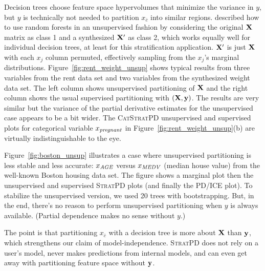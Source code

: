 \documentclass[12pt]{article}
\newcommand{\figref}[1]{Figure~\ref{#1}}
\newcommand{\spd}{\fontfamily{cmr}\textsc{\small StratPD}}
\newcommand{\cspd}{\fontfamily{cmr}\textsc{\small CatStratPD}}
\newcommand{\xnc}{$x_{\overline{c}}$}
\begin{document}
Decision trees choose feature space hypervolumes that minimize the variance in $y$, but $y$ is technically not needed to partition \xnc{} into similar regions. \cite{RFunsup} described how to use random forests in an unsupervised fashion by considering the original $\bf X$ matrix as class 1 and a synthesized $\bf X'$ as class 2, which works equally well for individual decision trees, at least for this stratification application. $\bf X'$ is just $\bf X$ with each $x_j$ column permuted, effectively sampling from the $x_j$'s marginal distributions. \figref{fig:rent_weight_unsup} shows typical results from three variables from the rent data set and two variables from the synthesized weight data set.  The left column shows unsupervised partitioning of $\bf X$ and the right column shows the usual supervised partitioning with $(\bf X, y)$. The results are very similar but the variance of the partial derivative estimates for the unsupervised case appears to be a bit wider. The \cspd{} unsupervised and supervised plots for categorical variable $x_{\it pregnant}$ in \figref{fig:rent_weight_unsup}(b) are virtually indistinguishable to the eye. 

\figref{fig:boston_unsup} illustrates a case where unsupervised partitioning is less stable and less accurate: $x_{\it AGE}$ versus $x_{\it MEDV}$ (median house value) from the well-known Boston housing data set. The figure shows a marginal plot then the unsupervised and supervised \spd{} plots (and finally the PD/ICE plot). To stabilize the unsupervised version, we used 20 trees with bootstrapping. But, in the end, there's no reason to perform unsupervised partitioning when $y$ is always available. (Partial dependence makes no sense without $y$.) 

The point is that partitioning \xnc{}  with a decision tree is more about $\bf X$ than $\bf y$, which strengthens our claim of model-independence. \spd{} does not rely on a user's model, never makes predictions from internal models, and can even get away with partitioning feature space without $\bf y$.
\end{document}
